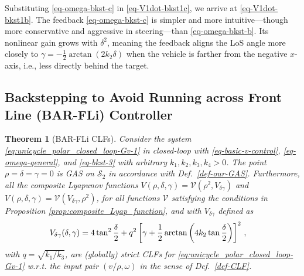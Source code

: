 \documentclass[journal,twoside,web]{ieeecolor}
\newtheorem{theorem}{Theorem}
\theoremstyle{definition}
\begin{document}
Substituting \eqref{eq-omega-bkst-c} in \eqref{eq-V1dot-bkst1c},
we arrive at \eqref{eq-V1dot-bkst1b}. 
The feedback \eqref{eq-omega-bkst-c} is simpler and more intuitive—though more conservative and aggressive in steering—than \eqref{eq-omega-bkst-b}. Its nonlinear gain grows with $\delta^2$, meaning the feedback aligns the LoS angle more closely to $\gamma = -\tfrac{1}{2}\arctan(2 k_2 \delta)$ when the vehicle is farther from the negative $x$-axis, i.e., less directly behind the target.

\subsection{Backstepping to Avoid Running across Front Line (BAR-FLi) Controller}
\label{sec:LiBaC_BARFLi} %


\begin{theorem}[BAR-FLi CLFs] 
\label{thm:CLF_BARFLi}
Consider the system \eqref{eq:unicycle_polar_closed_loop-Gv-1} in closed-loop with \eqref{eq-basic-v-control}, \eqref{eq-omega-general}, and \eqref{eq-bkst-3}  with arbitrary $k_1, k_2, k_3, k_4 > 0$.
The point $\rho = \delta = \gamma = 0$ is GAS on $\mathcal{S}_2$ in accordance with Def.~\ref{def-our-GAS}.
Furthermore, all the composite Lyapunov functions $V(\rho, \delta, \gamma) = \mathcal{V}(\rho^2, V_{\delta \gamma})$ and $V(\rho, \delta, \gamma) = \mathcal{V}(V_{\delta \gamma},\rho^2)$, for all functions $\mathcal{V}$ satisfying the conditions in Proposition \ref{prop:composite_Lyap_function}, and with $V_{\delta \gamma}$ defined as
\begin{equation}
\hspace*{-0.34cm}
V_{\delta \gamma} (\delta, \gamma) = 4\tan^2\frac{\delta}{2} + q^2\left[  \gamma + \frac{1}{2}\arctan\left(4k_2\tan \frac{\delta}{2} \right)  \right]^2 \,, \label{eq:CLF_BARFLi_gamma_delta}
\end{equation}
with $q = \sqrt{k_1/k_3}$, are (globally) strict CLFs for \eqref{eq:unicycle_polar_closed_loop-Gv-1} w.r.t. the input pair $(v/\rho,\omega)$ in the sense of Def.~\ref{def-CLF}. 
\end{theorem}
\end{document}
